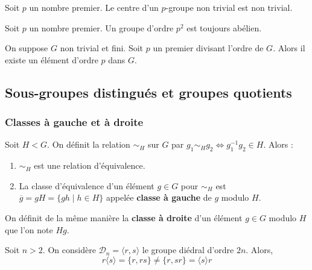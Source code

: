 	\begin{corollary}
		Soit $p$ un nombre premier. Le centre d'un $p$-groupe non trivial est non trivial.
	\end{corollary}

	\begin{corollary}
		Soit $p$ un nombre premier. Un groupe d'ordre $p^2$ est toujours abélien.
	\end{corollary}

	\begin{application}
		On suppose $G$ non trivial et fini. Soit $p$ un premier divisant l'ordre de $G$. Alors il existe un élément d'ordre $p$ dans $G$.
	\end{application}

	\subsection{Sous-groupes distingués et groupes quotients}

	\subsubsection{Classes à gauche et à droite}


	\begin{proposition}
		\label{103-1}
		Soit $H < G$. On définit la relation $\sim_H$ sur $G$ par $g_1 \sim_H g_2 \iff g_1^{-1} g_2 \in H$. Alors :
		\begin{enumerate}[label=(\roman*)]
			\item $\sim_H$ est une relation d'équivalence.
			\item La classe d'équivalence d'un élément $g \in G$ pour $\sim_H$ est $\overline{g} = gH = \{ gh \mid h \in H \}$ appelée \textbf{classe à gauche} de $g$ modulo $H$.
		\end{enumerate}
	\end{proposition}

	\begin{remark}
		On définit de la même manière la \textbf{classe à droite} d'un élément $g \in G$ modulo $H$ que l'on note $Hg$.
	\end{remark}

	\begin{example}
		Soit $n > 2$. On considère $\mathcal{D}_n = \langle r, s \rangle$ le groupe diédral d'ordre $2n$. Alors,
		\[ r \langle s \rangle = \{ r, rs \} \neq \{ r, sr \} = \langle s \rangle r \]
	\end{example}

